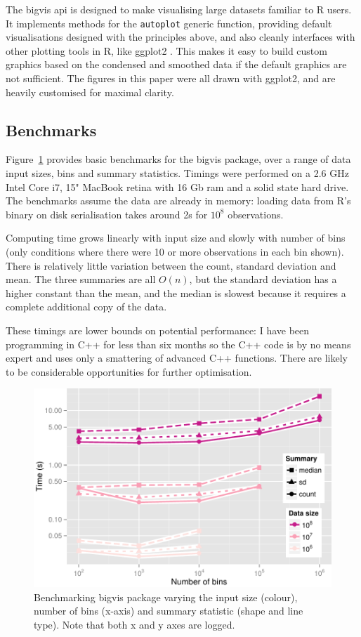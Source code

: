 \documentclass[journal]{vgtc}                %
\begin{document}
The bigvis {\sc api} is designed to make visualising large datasets familiar to R users. It implements methods for the {\tt autoplot} generic function, providing default visualisations designed with the principles above, and also cleanly interfaces with other plotting tools in R, like ggplot2 \citep{me:ggplot2,wickham:2007d}. This makes it easy to build custom graphics based on the condensed and smoothed data if the default graphics are not sufficient. The figures in this paper were all drawn with ggplot2, and are heavily customised for maximal clarity.

\subsection{Benchmarks}
\label{sub:benchmarks}

Figure~\ref{fig:benchmark} provides basic benchmarks for the bigvis package, over a range of data input sizes, bins and summary statistics. Timings were performed on a 2.6 GHz Intel Core i7, 15" MacBook retina with 16 Gb ram and a solid state hard drive. The benchmarks assume the data are already in memory: loading data from R's binary on disk serialisation takes around 2s for $10^8$ observations.

Computing time grows linearly with input size and slowly with number of bins (only conditions where there were 10 or more observations in each bin shown). There is relatively little variation between the count, standard deviation and mean. The three summaries are all $O(n)$, but the standard deviation has a higher constant than the mean, and the median is slowest because it requires a complete additional copy of the data. 

These timings are lower bounds on potential performance: I have been programming in C++ for less than six months so the C++ code is by no means expert and uses only a smattering of advanced C++ functions. There are likely to be considerable opportunities for further optimisation.

\begin{figure}
  \centering
   \includegraphics[width=\linewidth]{benchmark}
 \caption{Benchmarking bigvis package varying the input size (colour), number of bins (x-axis) and summary statistic (shape and line type). Note that both x and y axes are logged.}
 \label{fig:benchmark}
\end{figure}
\end{document}
